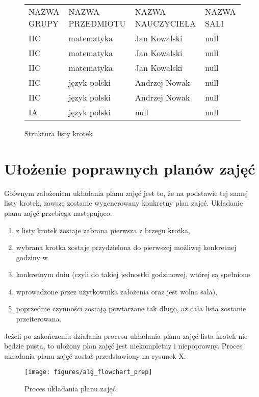 \begin{figure}[]
\begin{tabular}{llll}
NAZWA GRUPY & NAZWA PRZEDMIOTU & NAZWA NAUCZYCIELA & NAZWA SALI \\
IIC         & matematyka       & Jan Kowalski      & null       \\
IIC         & matematyka       & Jan Kowalski      & null       \\
IIC         & matematyka       & Jan Kowalski      & null       \\
IIC         & język polski     & Andrzej Nowak     & null       \\
IIC         & język polski     & Andrzej Nowak     & null       \\
IA          & język polski     & null              & null      
\end{tabular}
\caption{Struktura listy krotek} \label{rys:krotki}
\end{figure}

\section{Ułożenie poprawnych planów zajęć}

    Głównym założeniem układania planu zajęć jest to, że na podstawie tej samej listy krotek, zawsze zostanie wygenerowany konkretny plan zajęć. 
Układanie planu zajęć przebiega następująco:
\begin{enumerate}
	\item z listy krotek zostaje zabrana pierwsza z brzegu krotka,
	\item wybrana krotka zostaje przydzielona do pierwszej możliwej konkretnej godziny w 		\item konkretnym dniu (czyli do takiej jednostki godzinowej, wtórej są spełnione 			\item wprowadzone przez użytkownika założenia oraz jest wolna sala),
	\item poprzednie czynności zostają powtarzane tak długo, aż cała lista zostanie przeiterowana.
\end{enumerate}
Jeżeli po zakończeniu działania procesu układania planu zajęć lista krotek nie będzie pusta, to ułożony plan zajęć jest niekompletny i niepoprawny. Proces układania planu zajęć został przedstawiony na rysunek X.

\begin{figure}[h]
\centering\texttt{[image: figures/alg\_flowchart\_prep]}
\caption{Proces układania planu zajęć}\label{rys:time_table_prep}
\end{figure}

